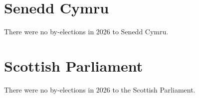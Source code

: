 \documentclass[a4paper,openany]{book}
\begin{document}
\section{Senedd Cymru}

There were no by-elections in 2026 to Senedd Cymru.

%
%
%


\section{Scottish Parliament}

There were no by-elections in 2026 to the Scottish Parliament.
\end{document}
